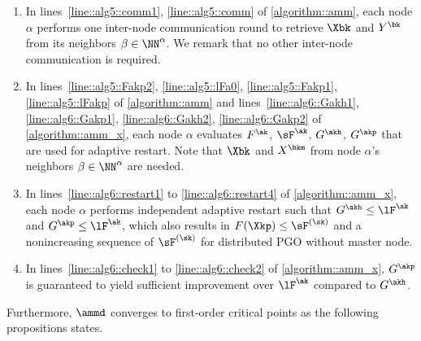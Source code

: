\begin{enumerate}[leftmargin=0.45cm]
	
\item In lines~\ref{line::alg5::comm1}, \ref{line::alg5::comm} of \cref{algorithm::amm}, each node $\alpha$ performs one inter-node communication round to retrieve $\Xbk$ and $Y^{\bk}$ from its neighbors $\beta\in\NN^\alpha$. We remark that no other inter-node communication is required.

\item In lines~\ref{line::alg5::Fakp2}, \ref{line::alg5::lFa0}, \ref{line::alg5::Fakp1}, \ref{line::alg5::lFakp} of \cref{algorithm::amm} and lines~\ref{line::alg6::Gakh1}, \ref{line::alg6::Gakp1}, \ref{line::alg6::Gakh2}, \ref{line::alg6::Gakp2} of \cref{algorithm::amm_x}, each node $\alpha$  evaluates $F^{\ak}$, $\sF^{\ak}$, $G^{\akh}$, $G^{\akp}$ that are used for adaptive restart. Note that $\Xbk$ and $X^{\bkm}$ from node $\alpha$'s neighbors  $\beta\in\NN^\alpha$ are needed.

\item In lines~\ref{line::alg6::restart1} to \ref{line::alg6::restart4} of \cref{algorithm::amm_x}, each node $\alpha$ performs independent adaptive restart such that $G^{\akh}\leq \lF^{\ak}$ and $G^{\akp}\leq \lF^{\ak}$, which also results in $F(\Xkp)\leq \sF^{(\sk)}$ and a nonincreasing sequence of $\sF^{(\sk)}$ for distributed PGO without master node. 
\item In lines~\ref{line::alg6::check1} to \ref{line::alg6::check2} of \cref{algorithm::amm_x}, $G^{\akp}$ is guaranteed to yield sufficient improvement over $\lF^{\ak}$ compared to $G^{\akh}$.
\end{enumerate}
Furthermore, $\ammd$  converges to first-order critical points as the following propositions states. 


%


 

